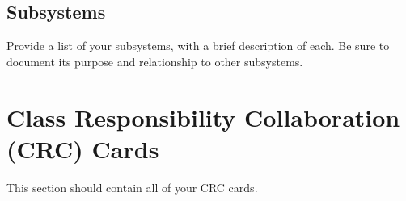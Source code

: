 \documentclass[]{article}
\begin{document}
\subsection{Subsystems}
\label{sub:subsystems}
 Provide a list of your subsystems, with a brief description of each. Be sure to document its purpose and relationship to other subsystems.


\clearpage	
\section{Class Responsibility Collaboration (CRC) Cards}
\label{sec:class_responsibility_collaboration_crc_cards}
This section should contain all of your CRC cards.
\end{document}
